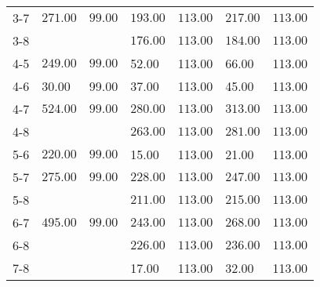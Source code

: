 \begin{table}[ht]
\begin{tabular}{rllllll}
  3-7 & \(\mathbf{271.00}\) & \(\mathbf{99.00}\) & \(\mathbf{193.00}\) & \(\mathbf{113.00}\) & \(\mathbf{217.00}\) & \(\mathbf{113.00}\) \\ 
  3-8 &  &  & \(\mathbf{176.00}\) & \(\mathbf{113.00}\) & \(\mathbf{184.00}\) & \(\mathbf{113.00}\) \\ 
  4-5 & \(\mathbf{249.00}\) & \(\mathbf{99.00}\) & 52.00 & 113.00 & 66.00 & 113.00 \\ 
  4-6 & 30.00 & 99.00 & 37.00 & 113.00 & 45.00 & 113.00 \\ 
  4-7 & \(\mathbf{524.00}\) & \(\mathbf{99.00}\) & \(\mathbf{280.00}\) & \(\mathbf{113.00}\) & \(\mathbf{313.00}\) & \(\mathbf{113.00}\) \\ 
  4-8 &  &  & \(\mathbf{263.00}\) & \(\mathbf{113.00}\) & \(\mathbf{281.00}\) & \(\mathbf{113.00}\) \\ 
  5-6 & \(\mathbf{220.00}\) & \(\mathbf{99.00}\) & 15.00 & 113.00 & 21.00 & 113.00 \\ 
  5-7 & \(\mathbf{275.00}\) & \(\mathbf{99.00}\) & \(\mathbf{228.00}\) & \(\mathbf{113.00}\) & \(\mathbf{247.00}\) & \(\mathbf{113.00}\) \\ 
  5-8 &  &  & \(\mathbf{211.00}\) & \(\mathbf{113.00}\) & \(\mathbf{215.00}\) & \(\mathbf{113.00}\) \\ 
  6-7 & \(\mathbf{495.00}\) & \(\mathbf{99.00}\) & \(\mathbf{243.00}\) & \(\mathbf{113.00}\) & \(\mathbf{268.00}\) & \(\mathbf{113.00}\) \\ 
  6-8 &  &  & \(\mathbf{226.00}\) & \(\mathbf{113.00}\) & \(\mathbf{236.00}\) & \(\mathbf{113.00}\) \\ 
  7-8 &  &  & 17.00 & 113.00 & 32.00 & 113.00 \\ 
   \bottomrule
\end{tabular}
\end{table}
